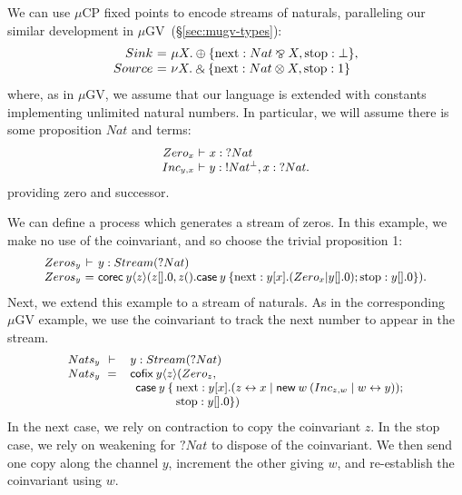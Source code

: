 \documentclass[orivec,envcountsame]{llncs}
\makeatletter
\newcommand{\with}{\mathbin\binampersand}
\newcommand{\parr}{\mathbin\bindnasrepma}
\newcommand{\cpdual}[1]{#1^\perp}
\newcommand{\cpbang}[1]{{! #1}}
\newcommand{\cpquery}[1]{{? #1}}
\newcommand{\mkwd}[1]{\mathsf{#1}}
\newcommand{\link}[2]{#1 \leftrightarrow #2}
\newcommand{\cut}[4]{\mkwd{new}\:#1 \: (#3 \mid #4)}
\newcommand{\corec}[5]{\mkwd{corec}\:#1 \langle #2 \rangle (#4,#5)}
\newcommand{\clabel}[1]{\mathrm{#1}}
\renewcommand{\case}[2]{\mkwd{case}\:#1\:\{#2\}}
\newcommand{\lrkwd}{\mkwd{cofix}}
\newcommand{\mucp}{$\mu\mathrm{CP}$\xspace}
\newcommand{\mugv}{$\mu\mathrm{GV}$\xspace}
\newcommand{\ba}{\begin{array}}
\newcommand{\ea}{\end{array}}
\newenvironment{equations}{\[\ba{@{}r@{~}c@{~}l@{}}}{\ea\]}
\newenvironment{eqs}{\ba{@{}r@{~}c@{~}l@{}}}{\ea}
\newcommand{\mcl}[2]{\multicolumn{#1}{l}{#2}}
\newcommand{\secref}[1]{(\S\ref{sec:#1})}
\makeatother
\begin{document}
We can use \mucp fixed points to encode streams of naturals, paralleling our similar development in
\mugv~\secref{mugv-types}: %
\begin{equations}
  Sink &=& \mu X. \oplus \{ \clabel{next}: Nat \parr X, \clabel{stop}: \bot \}, \\
  Source &=& \nu X. \with \{ \clabel{next}: Nat \otimes X, \clabel{stop}: 1 \} \\
\end{equations}%
where, as in \mugv, we assume that our language is extended with constants implementing unlimited
natural numbers. In particular, we will assume there is some proposition $Nat$ and terms:
\[\small\begin{eqs}
Zero_x &\vdash& x:\cpquery{Nat} \\
Inc_{y,x} &\vdash& y:\cpbang{\cpdual{Nat}},x:\cpquery{Nat}.
\end{eqs}\]
providing zero and successor.


We can define a process which generates a stream of zeros.  In this example, we make no use of the
coinvariant, and so choose the trivial proposition 1:
\[\small\begin{eqs}
  Zeros_y &\vdash& y:Stream(\cpquery{Nat}) \\
  Zeros_y &=& \corec{y}{z}{1}{z[].0}{z().\case{y}{\clabel{next}: y[x].(Zero_x | y[].0); \clabel{stop}: y[].0}}.
\end{eqs}\]
Next, we extend this example to a stream of naturals.  As in the corresponding \mugv example, we use
the coinvariant to track the next number to appear in the stream.
\[\small\begin{array}{r@{\hspace{2mm}}c@{\hspace{2mm}}l@{\hspace{0mm}}l@{\:}l}
  Nats_y & \vdash & \mcl{3}{y:Stream(\cpquery{Nat})} \\
  Nats_y & = & \mcl{3}{\lrkwd \: y \langle z \rangle (Zero_z,} \\
  & & \quad & \mkwd{case}\:y \:\{ & \clabel{next}: y[x].(\link{z}{x} \mid \cut{w}{}{Inc_{z,w}}{\link{w}{y}}); \\
  & & & & \clabel{stop}: y[].0\})
\end{array}\]
In the $\clabel{next}$ case, we rely on contraction to copy the coinvariant $z$. In the
$\clabel{stop}$ case, we rely on weakening for $\cpquery{Nat}$ to dispose of the coinvariant. We
then send one copy along the channel $y$, increment the other giving $w$, and re-establish the
coinvariant using $w$.
\end{document}

